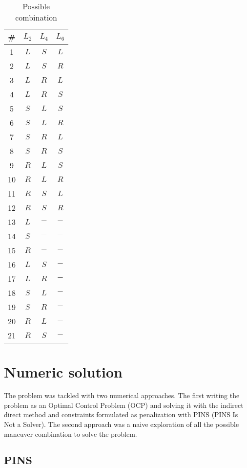 \documentclass[11pt,twocolumn]{scrartcl}
\begin{document}
\begin{table}[ht]
  \centering
  \begin{tabular}{c|c|c|c}
  \hline
  \textbf{\#} & \textbf{$L_2$} & \textbf{$L_4$} & \textbf{$L_6$} \\
  \hline
  1 & $L$ & $S$ & $L$  \\
  2 & $L$ & $S$ & $R$  \\
  3 & $L$ & $R$ & $L$  \\
  4 & $L$ & $R$ & $S$  \\
  5 & $S$ & $L$ & $S$  \\
  6 & $S$ & $L$ & $R$  \\
  7 & $S$ & $R$ & $L$  \\
  8 & $S$ & $R$ & $S$  \\
  9 & $R$ & $L$ & $S$  \\
  10 & $R$ & $L$ & $R$  \\
  11 & $R$ & $S$ & $L$  \\
  12 & $R$ & $S$ & $R$  \\
  13 & $L$ & $-$ & $-$  \\
  14 & $S$ & $-$ & $-$  \\
  15 & $R$ & $-$ & $-$  \\
  16 & $L$ & $S$ & $-$  \\
  17 & $L$ & $R$ & $-$  \\
  18 & $S$ & $L$ & $-$  \\
  19 & $S$ & $R$ & $-$  \\
  20 & $R$ & $L$ & $-$  \\
  21 & $R$ & $S$ & $-$  \\
  \hline
  \end{tabular}
  \caption{Possible combination}
  \label{tab:possiblecombination}
\end{table}
%
\section*{Numeric solution}

The problem was tackled with two numerical approaches. The first writing the problem as an Optimal Control Problem (OCP) and solving it with the indirect direct method and constraints formulated as penalization with PINS (PINS Is Not a Solver)\cite{biral2016notes}. The second approach was a naive exploration of all the possible maneuver combination to solve the problem.

\subsection*{PINS}
\end{document}
